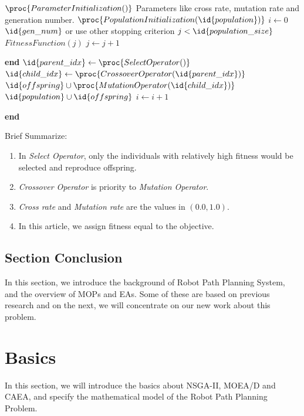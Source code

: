 \documentclass[a4paper, 11pt]{article}
\renewcommand{\End}{\kill\addtocounter{indent}{-1}\liprint\textbf{end} }
\begin{document}
\begin{codebox}
\li $\proc{ParameterInitialization()}$
\li \Comment Parameters like cross rate, mutation rate and generation number.
\li $\proc{PopulationInitialization(\id{population})}$
\li \For $i \gets 0$ \To $\id{gen\_num}$     \label{li:for}
\li \Comment or use other stopping criterion
\li     \Do                                  \label{li:for-begin}
\li     \While $j<\id{population\_size}$     \label{li:while}
\li         \Do $FitnessFunction(j)$       \label{li:while-begin}
\li             $j \gets j+1$             \label{li:while-end}
\li         \End
\li         $\id{parent\_idx} \gets \proc{SelectOperator()}$
\li         $\id{child\_idx} \gets \proc{CrossoverOperator(\id{parent\_idx})}$
\li         $\id{offspring} \cup \proc{MutationOperator(\id{child\_idx})}$
\li         $\id{population} \cup \id{offspring}$
\li         $i \gets i+1$          \label{li:for-end}
\li     \End
\end{codebox}
Brief Summarize:
\begin{enumerate}[1)]
\item In \emph{Select Operator}, only the individuals with relatively high fitness would be selected and reproduce offspring.
\item \emph{Crossover Operator} is priority to \emph{Mutation Operator}.
\item \emph{Cross rate} and \emph{Mutation rate} are the values in $(0.0, 1.0)$.
\item In this article, we assign fitness equal to the objective.
\end{enumerate}
\subsection{Section Conclusion}
In this section, we introduce the background of Robot Path Planning System,
and the overview of MOPs and EAs. Some of these are based on previous research
and on the next, we will concentrate on our new work about this problem.

\newpage
\section{Basics}
In this section, we will introduce the basics about NSGA-II, MOEA/D and CAEA,
and specify the mathematical model of the Robot Path Planning Problem.
\\
\end{document}
